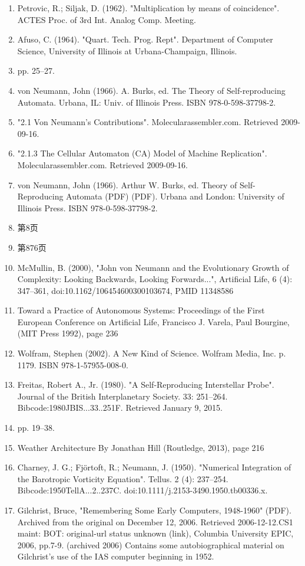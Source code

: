 \begin{enumerate}
\item Petrovic, R.; Siljak, D. (1962). "Multiplication by means of coincidence". ACTES Proc. of 3rd Int. Analog Comp. Meeting.
\item Afuso, C. (1964). "Quart. Tech. Prog. Rept". Department of Computer Science, University of Illinois at Urbana-Champaign, Illinois.
\item  pp. 25–27.
\item von Neumann, John (1966). A. Burks, ed. The Theory of Self-reproducing Automata. Urbana, IL: Univ. of Illinois Press. ISBN 978-0-598-37798-2.
\item "2.1 Von Neumann's Contributions". Molecularassembler.com. Retrieved 2009-09-16.
\item "2.1.3 The Cellular Automaton (CA) Model of Machine Replication". Molecularassembler.com. Retrieved 2009-09-16.
\item von Neumann, John (1966). Arthur W. Burks, ed. Theory of Self-Reproducing Automata (PDF) (PDF). Urbana and London: University of Illinois Press. ISBN 978-0-598-37798-2.
\item 第8页
\item 第876页
\item McMullin, B. (2000), "John von Neumann and the Evolutionary Growth of Complexity: Looking Backwards, Looking Forwards...", Artificial Life, 6 (4): 347–361, doi:10.1162/106454600300103674, PMID 11348586
\item Toward a Practice of Autonomous Systems: Proceedings of the First European Conference on Artificial Life, Francisco J. Varela, Paul Bourgine, (MIT Press 1992), page 236
\item Wolfram, Stephen (2002). A New Kind of Science. Wolfram Media, Inc. p. 1179. ISBN 978-1-57955-008-0.
\item Freitas, Robert A., Jr. (1980). "A Self-Reproducing Interstellar Probe". Journal of the British Interplanetary Society. 33: 251–264. Bibcode:1980JBIS...33..251F. Retrieved January 9, 2015.
\item  pp. 19–38.
\item Weather Architecture By Jonathan Hill (Routledge, 2013), page 216
\item Charney, J. G.; Fjörtoft, R.; Neumann, J. (1950). "Numerical Integration of the Barotropic Vorticity Equation". Tellus. 2 (4): 237–254. Bibcode:1950TellA...2..237C. doi:10.1111/j.2153-3490.1950.tb00336.x.
\item Gilchrist, Bruce, "Remembering Some Early Computers, 1948-1960" (PDF). Archived from the original on December 12, 2006. Retrieved 2006-12-12.CS1 maint: BOT: original-url status unknown (link), Columbia University EPIC, 2006, pp.7-9. (archived 2006) Contains some autobiographical material on Gilchrist's use of the IAS computer beginning in 1952.

\end{enumerate}

